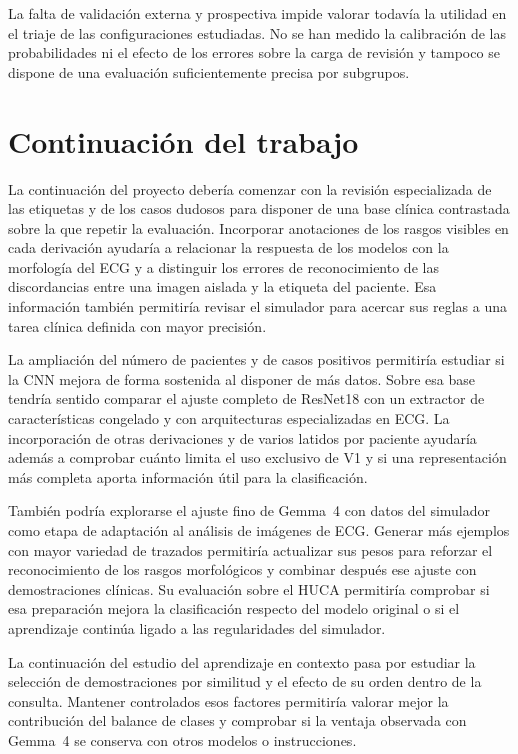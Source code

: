 La falta de validación externa y prospectiva impide valorar todavía la utilidad en el triaje de las configuraciones estudiadas. No se han medido la calibración de las probabilidades ni el efecto de los errores sobre la carga de revisión y tampoco se dispone de una evaluación suficientemente precisa por subgrupos.

\section{Continuación del trabajo}

La continuación del proyecto debería comenzar con la revisión especializada de las etiquetas y de los casos dudosos para disponer de una base clínica contrastada sobre la que repetir la evaluación. Incorporar anotaciones de los rasgos visibles en cada derivación ayudaría a relacionar la respuesta de los modelos con la morfología del ECG y a distinguir los errores de reconocimiento de las discordancias entre una imagen aislada y la etiqueta del paciente. Esa información también permitiría revisar el simulador para acercar sus reglas a una tarea clínica definida con mayor precisión.

La ampliación del número de pacientes y de casos positivos permitiría estudiar si la CNN mejora de forma sostenida al disponer de más datos. Sobre esa base tendría sentido comparar el ajuste completo de ResNet18 con un extractor de características congelado y con arquitecturas especializadas en ECG. La incorporación de otras derivaciones y de varios latidos por paciente ayudaría además a comprobar cuánto limita el uso exclusivo de V1 y si una representación más completa aporta información útil para la clasificación.

También podría explorarse el ajuste fino de Gemma~4 con datos del simulador como etapa de adaptación al análisis de imágenes de ECG. Generar más ejemplos con mayor variedad de trazados permitiría actualizar sus pesos para reforzar el reconocimiento de los rasgos morfológicos y combinar después ese ajuste con demostraciones clínicas. Su evaluación sobre el HUCA permitiría comprobar si esa preparación mejora la clasificación respecto del modelo original o si el aprendizaje continúa ligado a las regularidades del simulador.

La continuación del estudio del aprendizaje en contexto pasa por estudiar la selección de demostraciones por similitud y el efecto de su orden dentro de la consulta. Mantener controlados esos factores permitiría valorar mejor la contribución del balance de clases y comprobar si la ventaja observada con Gemma~4 se conserva con otros modelos o instrucciones.

